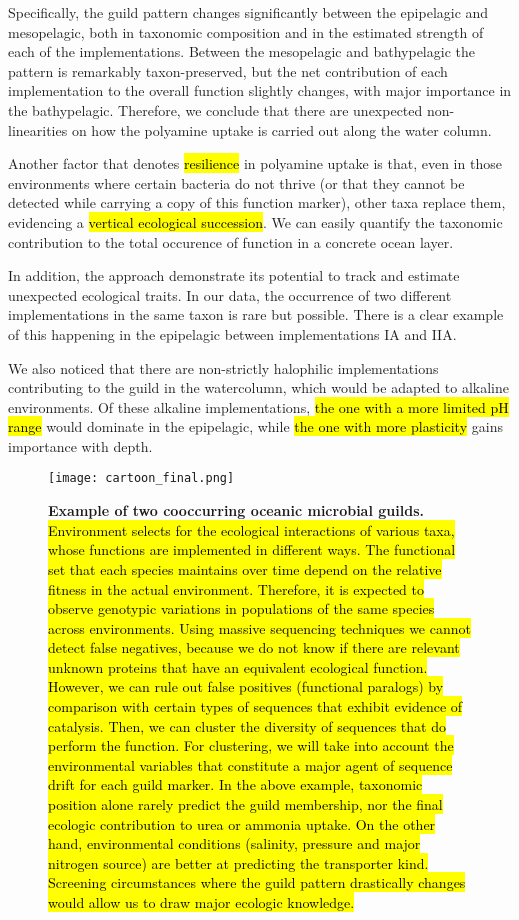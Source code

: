 \documentclass[Journal,letterpaper,NoLists]{ascelike-new}
\begin{document}
Specifically, the guild pattern changes significantly between the epipelagic and mesopelagic, both in taxonomic composition and in the estimated strength of each of the implementations. Between the mesopelagic and bathypelagic the pattern is remarkably taxon-preserved, but the net contribution of each implementation to the overall function slightly changes, with major importance in the bathypelagic. Therefore, we conclude that there are unexpected non-linearities on how the polyamine uptake is carried out along the water column. 

Another factor that denotes \hl{resilience} in polyamine uptake is that, even in those environments where certain bacteria do not thrive (or that they cannot be detected while carrying a copy of this function marker), other taxa replace them, evidencing a \hl{vertical ecological succession}. We can easily quantify the taxonomic contribution to the total occurence of function in a concrete ocean layer.

In addition, the approach demonstrate its potential to track and estimate unexpected ecological traits. In our data, the occurrence of two different implementations in the same taxon is rare but possible. There is a clear example of this happening in the epipelagic between implementations IA and IIA. 

We also noticed that there are non-strictly halophilic implementations contributing to the guild in the watercolumn, which would be adapted to alkaline environments. Of these alkaline implementations, \hl{the one with a more limited pH range} would dominate in the epipelagic, while \hl{the one with more plasticity} gains importance with depth. 

\begin{figure}[]
\centering
\texttt{[image: cartoon\_final.png]}
\caption{ {\bf Example of two cooccurring oceanic microbial guilds.} \hl{Environment selects for the ecological interactions of various taxa, whose functions are implemented in different ways. The functional set that each species maintains over time depend on the relative fitness in the actual environment. Therefore, it is expected to observe genotypic variations in populations of the same species across environments. Using massive sequencing techniques we cannot detect false negatives, because we do not know if there are relevant unknown proteins that have an equivalent ecological function. However, we can rule out false positives (functional paralogs) by comparison with certain types of sequences that exhibit evidence of catalysis. Then, we can cluster the diversity of sequences that do perform the function. For clustering, we will take into account the environmental variables that constitute a major agent of sequence drift for each guild marker. In the above example, taxonomic position alone rarely predict the guild membership, nor the final ecologic contribution to urea or ammonia uptake. On the other hand, environmental conditions (salinity, pressure and major nitrogen source) are better at predicting the transporter kind. Screening circumstances where the guild pattern drastically changes would allow us to draw major ecologic knowledge.}}
\label{fig:Fig1}
\end{figure}
\end{document}
